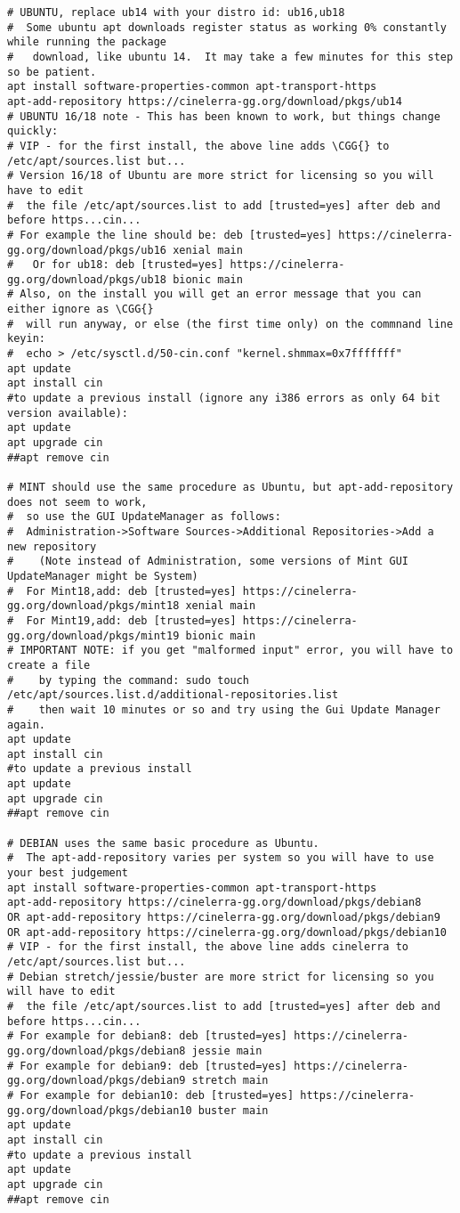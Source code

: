 {\begin{verbatim}
# UBUNTU, replace ub14 with your distro id: ub16,ub18
#  Some ubuntu apt downloads register status as working 0% constantly while running the package
#   download, like ubuntu 14.  It may take a few minutes for this step so be patient.
apt install software-properties-common apt-transport-https
apt-add-repository https://cinelerra-gg.org/download/pkgs/ub14
# UBUNTU 16/18 note - This has been known to work, but things change quickly:
# VIP - for the first install, the above line adds \CGG{} to /etc/apt/sources.list but...
# Version 16/18 of Ubuntu are more strict for licensing so you will have to edit
#  the file /etc/apt/sources.list to add [trusted=yes] after deb and before https...cin...
# For example the line should be: deb [trusted=yes] https://cinelerra-gg.org/download/pkgs/ub16 xenial main
#   Or for ub18: deb [trusted=yes] https://cinelerra-gg.org/download/pkgs/ub18 bionic main
# Also, on the install you will get an error message that you can either ignore as \CGG{}
#  will run anyway, or else (the first time only) on the commnand line keyin:
#  echo > /etc/sysctl.d/50-cin.conf "kernel.shmmax=0x7fffffff"
apt update
apt install cin
#to update a previous install (ignore any i386 errors as only 64 bit version available):
apt update
apt upgrade cin
##apt remove cin

# MINT should use the same procedure as Ubuntu, but apt-add-repository does not seem to work,
#  so use the GUI UpdateManager as follows:
#  Administration->Software Sources->Additional Repositories->Add a new repository
#    (Note instead of Administration, some versions of Mint GUI UpdateManager might be System)
#  For Mint18,add: deb [trusted=yes] https://cinelerra-gg.org/download/pkgs/mint18 xenial main
#  For Mint19,add: deb [trusted=yes] https://cinelerra-gg.org/download/pkgs/mint19 bionic main
# IMPORTANT NOTE: if you get "malformed input" error, you will have to create a file
#    by typing the command: sudo touch /etc/apt/sources.list.d/additional-repositories.list
#    then wait 10 minutes or so and try using the Gui Update Manager again.
apt update
apt install cin
#to update a previous install
apt update
apt upgrade cin
##apt remove cin

# DEBIAN uses the same basic procedure as Ubuntu.
#  The apt-add-repository varies per system so you will have to use your best judgement
apt install software-properties-common apt-transport-https
apt-add-repository https://cinelerra-gg.org/download/pkgs/debian8
OR apt-add-repository https://cinelerra-gg.org/download/pkgs/debian9
OR apt-add-repository https://cinelerra-gg.org/download/pkgs/debian10
# VIP - for the first install, the above line adds cinelerra to /etc/apt/sources.list but...
# Debian stretch/jessie/buster are more strict for licensing so you will have to edit
#  the file /etc/apt/sources.list to add [trusted=yes] after deb and before https...cin...
# For example for debian8: deb [trusted=yes] https://cinelerra-gg.org/download/pkgs/debian8 jessie main
# For example for debian9: deb [trusted=yes] https://cinelerra-gg.org/download/pkgs/debian9 stretch main
# For example for debian10: deb [trusted=yes] https://cinelerra-gg.org/download/pkgs/debian10 buster main
apt update
apt install cin
#to update a previous install
apt update
apt upgrade cin
##apt remove cin


\end{verbatim}}
